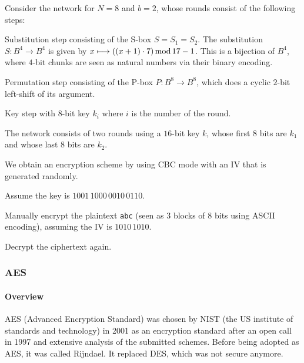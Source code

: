 \begin{exercise}\label{exc:sd:spn}
Consider the network for $N=8$ and $b=2$, whose rounds consist of the following steps:
\begin{compactenum}
 \item Substitution step consisting of the S-box $S=S_1=S_2$.
  The substitution $S:B^4\to B^4$ is given by $x\longmapsto ((x+1)\cdot 7)\mathop{\mathrm{mod}} 17-1$.
  This is a bijection of $B^4$, where $4$-bit chunks are seen as natural numbers via their binary encoding.
 \item Permutation step consisting of the P-box $P:B^8\to B^8$, which does a cyclic $2$-bit left-shift of its argument.
 \item Key step with $8$-bit key $k_i$ where $i$ is the number of the round.
\end{compactenum}
The network consists of two rounds using a $16$-bit key $k$, whose first $8$ bits are $k_1$ and whose last $8$ bits are $k_2$.

We obtain an encryption scheme by using CBC mode with an IV that is generated randomly.

Assume the key is $1001\,1000\,0010\,0110$.

Manually encrypt the plaintext \texttt{abc} (seen as $3$ blocks of $8$ bits using ASCII encoding), assuming the IV is $1010\,1010$.

Decrypt the ciphertext again.
\end{exercise}



\subsubsection{AES}

\paragraph{Overview}
AES (Advanced Encryption Standard) was chosen by NIST (the US institute of standards and technology) in 2001 as an encryption standard after an open call in 1997 and extensive analysis of the submitted schemes.
Before being adopted as AES, it was called Rijndael.
It replaced DES, which was not secure anymore.


